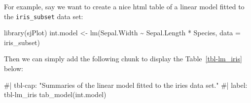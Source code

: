 \documentclass[
  letterpaper,
  DIV=11,
  numbers=noendperiod]{scrartcl}
\newenvironment{Shaded}{\begin{snugshade}}{\end{snugshade}}
\newcommand{\AttributeTok}[1]{\textcolor[rgb]{0.40,0.45,0.13}{#1}}
\newcommand{\CommentTok}[1]{\textcolor[rgb]{0.37,0.37,0.37}{#1}}
\newcommand{\FunctionTok}[1]{\textcolor[rgb]{0.28,0.35,0.67}{#1}}
\newcommand{\NormalTok}[1]{\textcolor[rgb]{0.00,0.23,0.31}{#1}}
\newcommand{\OtherTok}[1]{\textcolor[rgb]{0.00,0.23,0.31}{#1}}
\newcommand{\SpecialCharTok}[1]{\textcolor[rgb]{0.37,0.37,0.37}{#1}}
\begin{document}
For example, say we want to create a nice html table of a linear model
fitted to the \texttt{iris\_subset} data set:

\begin{Shaded}
\begin{Highlighting}[]
\FunctionTok{library}\NormalTok{(sjPlot)}
\NormalTok{int.model }\OtherTok{\textless{}{-}} \FunctionTok{lm}\NormalTok{(Sepal.Width }\SpecialCharTok{\textasciitilde{}}\NormalTok{ Sepal.Length }\SpecialCharTok{*}\NormalTok{ Species, }\AttributeTok{data =}\NormalTok{ iris\_subset)}
\end{Highlighting}
\end{Shaded}

Then we can simply add the following chunk to display the
Table~\ref{tbl-lm_iris} below:

\begin{Shaded}
\begin{Highlighting}[]
\CommentTok{\#| tbl{-}cap: "Summaries of the linear model fitted to the iries  data set."}
\CommentTok{\#| label: tbl{-}lm\_iris}
\FunctionTok{tab\_model}\NormalTok{(int.model)}
\end{Highlighting}
\end{Shaded}
\end{document}
